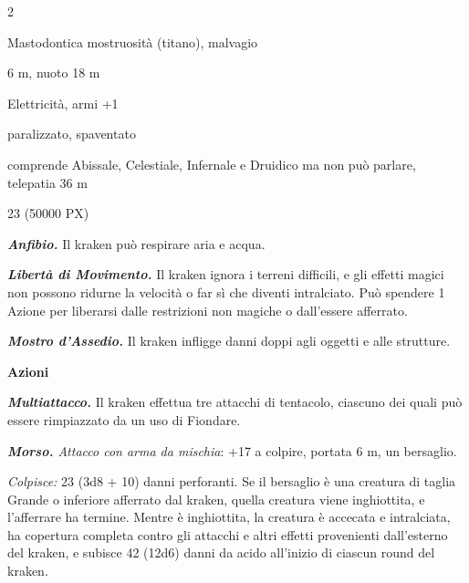 \begin{multicols}{2}
{%

\begin{description}[noitemsep, topsep=0pt, parsep=0pt, partopsep=0pt, itemsep=1pt, leftmargin=2.35cm,  labelwidth=2.2cm, itemindent=0cm, listparindent=0pt] %
\setlength{\baselineskip}{10pt}
\item[\textbf{Taglia/Tipo}] Mastodontica mostruosità (titano), malvagio
\item[\textbf{Caratt.}] 
\item[\textbf{Punti Ferita}] 
\item[\textbf{Movimento}] 6 m, nuoto 18 m
\item[\textbf{Tiri Salvez.}] 
\item[\textbf{Imm. Danni}] Elettricità, armi +1
\item[\textbf{Immunità}] paralizzato, spaventato
\item[\textbf{Sensi}] 
\item[\textbf{Linguaggi}] comprende Abissale, Celestiale, Infernale e Druidico ma non può parlare, telepatia 36 m
\item[\textbf{Sfida}] 23 (50000 PX)
\end{description}
\smallskip

\emph{\textbf{Anfibio.}} Il kraken può respirare aria e acqua.

\emph{\textbf{Libertà di Movimento.}} Il kraken ignora i terreni difficili, e gli effetti magici non possono ridurne la velocità o far sì che diventi intralciato. Può spendere 1 Azione per liberarsi dalle restrizioni non magiche o dall'essere afferrato.

\emph{\textbf{Mostro d'Assedio.}} Il kraken infligge danni doppi agli oggetti e alle strutture.

\textbf{Azioni}

\emph{\textbf{Multiattacco.}} Il kraken effettua tre attacchi di tentacolo, ciascuno dei quali può essere rimpiazzato da un uso di Fiondare.

\emph{\textbf{Morso.} Attacco con arma da mischia}: +17 a colpire, portata 6 m, un bersaglio.

\emph{Colpisce:} 23 (3d8 + 10) danni perforanti. Se il bersaglio è una creatura di taglia Grande o inferiore afferrato dal kraken, quella creatura viene inghiottita, e l'afferrare ha termine. Mentre è inghiottita, la creatura è accecata e intralciata, ha copertura completa contro gli attacchi e altri effetti provenienti dall'esterno del kraken, e subisce 42 (12d6) danni da acido all'inizio di ciascun round del kraken.

}
\end{multicols}
